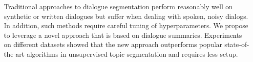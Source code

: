 Traditional approaches to dialogue segmentation perform reasonably well on synthetic or written dialogues but suffer when dealing with spoken, noisy dialogs. In addition, such methods require careful tuning of hyperparameters. We propose to leverage a novel approach that is based on dialogue summaries. Experiments on different datasets showed that the new approach outperforms popular state-of-the-art algorithms in unsupervised topic segmentation and requires less setup.